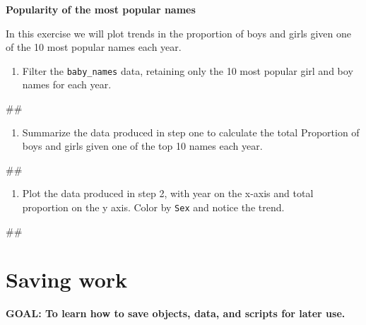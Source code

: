 \documentclass[]{book}
\newenvironment{Shaded}{\begin{snugshade}}{\end{snugshade}}
\newcommand{\NormalTok}[1]{#1}
\providecommand{\tightlist}{%
  \setlength{\itemsep}{0pt}\setlength{\parskip}{0pt}}
\begin{document}
\textbf{Popularity of the most popular names}

In this exercise we will plot trends in the proportion of boys and girls
given one of the 10 most popular names each year.

\begin{enumerate}
\def\labelenumi{\arabic{enumi}.}
\tightlist
\item
  Filter the \texttt{baby\_names} data, retaining only the 10 most
  popular girl and boy names for each year.
\end{enumerate}

\begin{Shaded}
\begin{Highlighting}[]
\NormalTok{##}
\end{Highlighting}
\end{Shaded}

\begin{enumerate}
\def\labelenumi{\arabic{enumi}.}
\setcounter{enumi}{1}
\tightlist
\item
  Summarize the data produced in step one to calculate the total
  Proportion of boys and girls given one of the top 10 names each year.
\end{enumerate}

\begin{Shaded}
\begin{Highlighting}[]
\NormalTok{##}
\end{Highlighting}
\end{Shaded}

\begin{enumerate}
\def\labelenumi{\arabic{enumi}.}
\setcounter{enumi}{2}
\tightlist
\item
  Plot the data produced in step 2, with year on the x-axis and total
  proportion on the y axis. Color by \texttt{Sex} and notice the trend.
\end{enumerate}

\begin{Shaded}
\begin{Highlighting}[]
\NormalTok{##}
\end{Highlighting}
\end{Shaded}

\section{Saving work}\label{saving-work}

\textbf{GOAL: To learn how to save objects, data, and scripts for later
use.}
\end{document}
